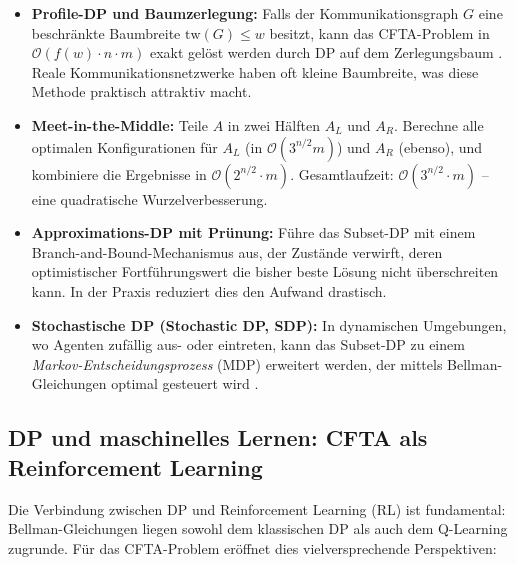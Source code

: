 ﻿\documentclass[a4paper,12pt]{article}
\theoremstyle{definition}
\begin{document}
\begin{itemize}
    \item \textbf{Profile-DP und Baumzerlegung:} Falls der Kommunikationsgraph $G$
          eine beschr\"{a}nkte Baumbreite $\mathrm{tw}(G) \leq w$ besitzt, kann das
          CFTA-Problem in $\mathcal{O}(f(w) \cdot n \cdot m)$ exakt gel\"{o}st werden
          durch DP auf dem Zerlegungsbaum \cite{cygan2015}. Reale Kommunikationsnetzwerke
          haben oft kleine Baumbreite, was diese Methode praktisch attraktiv macht.
    \item \textbf{Meet-in-the-Middle:} Teile $A$ in zwei H\"{a}lften $A_L$ und $A_R$.
          Berechne alle optimalen Konfigurationen f\"{u}r $A_L$ (in $\mathcal{O}(3^{n/2} m)$)
          und $A_R$ (ebenso), und kombiniere die Ergebnisse in $\mathcal{O}(2^{n/2} \cdot m)$.
          Gesamtlaufzeit: $\mathcal{O}(3^{n/2} \cdot m)$ -- eine quadratische
          Wurzelverbesserung.
    \item \textbf{Approximations-DP mit Pr\"{u}nung:} F\"{u}hre das Subset-DP
          mit einem Branch-and-Bound-Mechanismus aus, der Zust\"{a}nde verwirft,
          deren optimistischer Fortf\"{u}hrungswert die bisher beste L\"{o}sung
          nicht \"{u}berschreiten kann. In der Praxis reduziert dies den Aufwand
          drastisch.
    \item \textbf{Stochastische DP (Stochastic DP, SDP):} In dynamischen
          Umgebungen, wo Agenten zuf\"{a}llig aus- oder eintreten, kann das
          Subset-DP zu einem \emph{Markov-Entscheidungsprozess} (MDP) erweitert
          werden, der mittels Bellman-Gleichungen optimal gesteuert wird \cite{sutton2018}.
\end{itemize}

\subsection{DP und maschinelles Lernen: CFTA als Reinforcement Learning}

Die Verbindung zwischen DP und Reinforcement Learning (RL) \cite{sutton2018} ist
fundamental: Bellman-Gleichungen liegen sowohl dem klassischen DP als auch dem
Q-Learning zugrunde. F\"{u}r das CFTA-Problem er\"{o}ffnet dies vielversprechende
Perspektiven:
\end{document}
